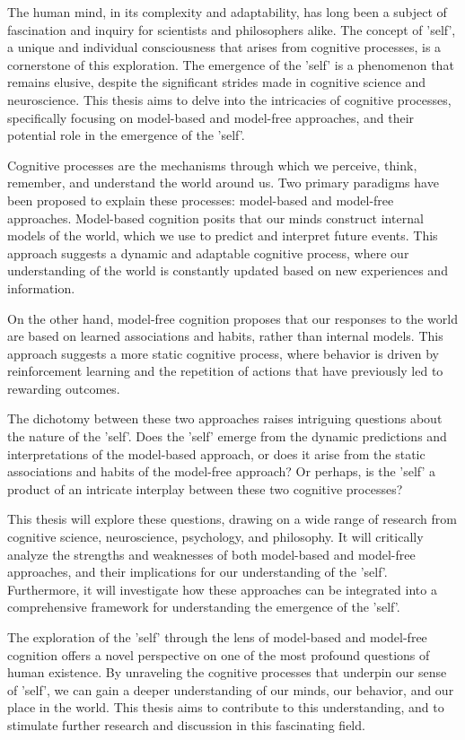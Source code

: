 The human mind, in its complexity and adaptability, has long been a subject of fascination and inquiry for scientists and philosophers alike. The concept of 'self', a unique and individual consciousness that arises from cognitive processes, is a cornerstone of this exploration. The emergence of the 'self' is a phenomenon that remains elusive, despite the significant strides made in cognitive science and neuroscience. This thesis aims to delve into the intricacies of cognitive processes, specifically focusing on model-based and model-free approaches, and their potential role in the emergence of the 'self'.

Cognitive processes are the mechanisms through which we perceive, think, remember, and understand the world around us. Two primary paradigms have been proposed to explain these processes: model-based and model-free approaches. Model-based cognition posits that our minds construct internal models of the world, which we use to predict and interpret future events. This approach suggests a dynamic and adaptable cognitive process, where our understanding of the world is constantly updated based on new experiences and information.

On the other hand, model-free cognition proposes that our responses to the world are based on learned associations and habits, rather than internal models. This approach suggests a more static cognitive process, where behavior is driven by reinforcement learning and the repetition of actions that have previously led to rewarding outcomes.

The dichotomy between these two approaches raises intriguing questions about the nature of the 'self'. Does the 'self' emerge from the dynamic predictions and interpretations of the model-based approach, or does it arise from the static associations and habits of the model-free approach? Or perhaps, is the 'self' a product of an intricate interplay between these two cognitive processes?

This thesis will explore these questions, drawing on a wide range of research from cognitive science, neuroscience, psychology, and philosophy. It will critically analyze the strengths and weaknesses of both model-based and model-free approaches, and their implications for our understanding of the 'self'. Furthermore, it will investigate how these approaches can be integrated into a comprehensive framework for understanding the emergence of the 'self'.

The exploration of the 'self' through the lens of model-based and model-free cognition offers a novel perspective on one of the most profound questions of human existence. By unraveling the cognitive processes that underpin our sense of 'self', we can gain a deeper understanding of our minds, our behavior, and our place in the world. This thesis aims to contribute to this understanding, and to stimulate further research and discussion in this fascinating field.


